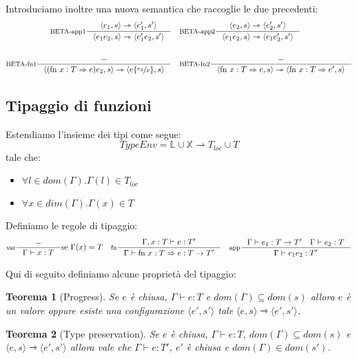 \documentclass[a4paper, 11pt]{article}
\newtheorem{thm}{Teorema}[section]
\newcommand{\type}{\Gamma \vdash}
\newcommand{\subs}[3]{#1 \lbrace \sfrac{#2}{#3} \rbrace}
\begin{document}
Introduciamo inoltre una nuova semantica che raccoglie le due precedenti: \begin{align*}
	\inference[BETA-app1]{\langle e_1, s \rangle \rightarrowtriangle \langle e_1', s' \rangle}{\langle e_1e_2,s \rangle \rightarrowtriangle \langle e_1'e_2, s' \rangle} \quad &\inference[BETA-app2]{\langle e_2,s \rangle \rightarrowtriangle \langle e_2',s' \rangle}{\langle e_1e_2,s \rangle \rightarrowtriangle \langle e_1e_2',s' \rangle} \\ \\
	\inference[BETA-fn1]{-}{\langle (\text{fn }x:T \Rightarrow e)e_2, s \rangle \rightarrowtriangle \langle \subs{e}{e_2}{x},s \rangle} \quad &\inference[BETA-fn2]{-}{\langle \text{fn }x:T \Rightarrow e, s \rangle \rightarrowtriangle \langle \text{fn }x:T \Rightarrow e', s \rangle}
\end{align*}

\subsection{Tipaggio di funzioni}
Estendiamo l'insieme dei tipi come segue: \[ TypeEnv = \mathbb{L} \cup \mathbb{X} \rightharpoonup T_{loc} \cup T \] tale che: \begin{itemize}
	\item $\forall l \in dom(\Gamma). \Gamma(l) \in T_{loc}$
	\item $\forall x \in dim(\Gamma). \Gamma(x) \in T$
\end{itemize}

Definiamo le regole di tipaggio: \begin{align*}
	\inference[var]{-}{\type x:T} \text{se } \Gamma(x) = T \quad 
	\inference[fn]{\Gamma, x :T \vdash e:T'}{\type \text{fn } x :T \Rightarrow e:T \to T'} \quad
	\inference[app]{\type e_1:T \to T' \quad \type e_2:T}{\type e_1e_2:T'}
\end{align*}

Qui di seguito definiamo alcune proprietà del tipaggio:
\begin{thm}[Progress]
	Se $e$ è chiusa, $\type e:T$ e $dom(\Gamma) \subseteq dom(s)$ allora $e$ è un valore oppure esiste una configurazione $\langle e',s' \rangle$ tale $\langle e,s \rangle \rightarrowtriangle \langle e',s' \rangle$.
\end{thm}

\begin{thm}[Type preservation]
	Se $e$ è chiusa, $\type e:T$, $dom(\Gamma) \subseteq dom(s)$ e $\langle e,s \rangle \rightarrowtriangle \langle e',s' \rangle$ allora vale che $\type e:T'$, $e'$ è chiusa e $dom(\Gamma) \in dom(s')$.
\end{thm}
\end{document}
